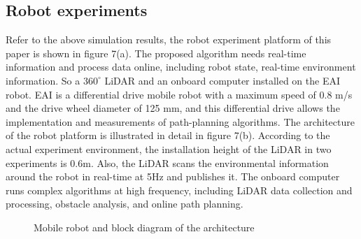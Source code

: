 \documentclass{iosart2c}
\begin{document}
\subsection{Robot experiments}\label{s4.2}
Refer to the above simulation results, the robot experiment platform of this paper is shown in figure 7(a). The proposed algorithm needs real-time information and process data online, including robot state, real-time environment information. So a $360^{\circ}$ LiDAR and an onboard computer installed on the EAI robot. EAI is a differential drive mobile robot with a maximum speed of 0.8 m/s and the drive wheel diameter of 125 mm, and this differential drive allows the implementation and measurements of path-planning algorithms. The architecture of the robot platform is illustrated in detail in figure 7(b). According to the actual experiment environment, the installation height of the LiDAR in two experiments is 0.6m. Also, the LiDAR scans the environmental information around the robot in real-time at 5Hz and publishes it. The onboard computer runs complex algorithms at high frequency, including LiDAR data collection and processing, obstacle analysis, and online path planning.
\begin{figure}[htbp] %
\vspace{-0.2cm} 
\setlength{\abovecaptionskip}{0.1cm}  %
\centering
{}\vspace{-3mm}  %
\caption{  Mobile robot and block diagram of the architecture }
\end{figure}
\end{document}
